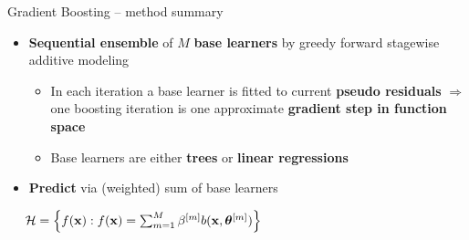 \begin{frame}{Gradient Boosting -- method summary}

 

\medskip


\begin{itemize}
  \item \textbf{Sequential ensemble} of $M$ \textbf{base learners} by greedy forward stagewise additive modeling
  \begin{itemize}
      \item In each iteration a base learner is fitted to current \textbf{pseudo residuals} $\Rightarrow$ one boosting iteration is one approximate \textbf{gradient step in function space}
      \item Base learners are either \textbf{trees} or \textbf{linear regressions}
  \end{itemize}
  \item \textbf{Predict} via (weighted) sum of base learners
  
\end{itemize}

\medskip

 ~~
$\mathcal{H} = \left\{ f(\mathbf{x}): f(\mathbf{x}) = \sum_{m = 1}^M \beta^{[m]} b(\mathbf{x}, \bm{\theta}^{[m]}) \right\}$


\end{frame}
